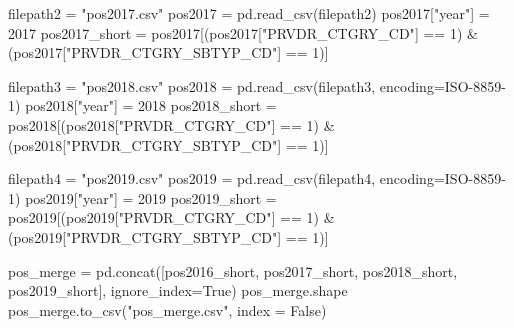 \documentclass[
  letterpaper,
  DIV=11,
  numbers=noendperiod]{scrartcl}
\newenvironment{Shaded}{\begin{snugshade}}{\end{snugshade}}
\newcommand{\DecValTok}[1]{\textcolor[rgb]{0.68,0.00,0.00}{#1}}
\newcommand{\NormalTok}[1]{\textcolor[rgb]{0.00,0.23,0.31}{#1}}
\newcommand{\OperatorTok}[1]{\textcolor[rgb]{0.37,0.37,0.37}{#1}}
\newcommand{\StringTok}[1]{\textcolor[rgb]{0.13,0.47,0.30}{#1}}
\newcommand{\VariableTok}[1]{\textcolor[rgb]{0.07,0.07,0.07}{#1}}
\begin{document}
\begin{Shaded}
\begin{Highlighting}[]
\NormalTok{filepath2 }\OperatorTok{=} \StringTok{"pos2017.csv"}
\NormalTok{pos2017 }\OperatorTok{=}\NormalTok{ pd.read\_csv(filepath2)}
\NormalTok{pos2017[}\StringTok{"year"}\NormalTok{] }\OperatorTok{=} \DecValTok{2017}
\NormalTok{pos2017\_short }\OperatorTok{=}\NormalTok{ pos2017[(pos2017[}\StringTok{"PRVDR\_CTGRY\_CD"}\NormalTok{] }\OperatorTok{==} \DecValTok{1}\NormalTok{) }\OperatorTok{\&}\NormalTok{ (pos2017[}\StringTok{"PRVDR\_CTGRY\_SBTYP\_CD"}\NormalTok{] }\OperatorTok{==} \DecValTok{1}\NormalTok{)]}


\NormalTok{filepath3 }\OperatorTok{=} \StringTok{"pos2018.csv"}
\NormalTok{pos2018 }\OperatorTok{=}\NormalTok{ pd.read\_csv(filepath3, encoding}\OperatorTok{=}\StringTok{\textquotesingle{}ISO{-}8859{-}1\textquotesingle{}}\NormalTok{)}
\NormalTok{pos2018[}\StringTok{"year"}\NormalTok{] }\OperatorTok{=} \DecValTok{2018}
\NormalTok{pos2018\_short }\OperatorTok{=}\NormalTok{ pos2018[(pos2018[}\StringTok{"PRVDR\_CTGRY\_CD"}\NormalTok{] }\OperatorTok{==} \DecValTok{1}\NormalTok{) }\OperatorTok{\&}\NormalTok{ (pos2018[}\StringTok{"PRVDR\_CTGRY\_SBTYP\_CD"}\NormalTok{] }\OperatorTok{==} \DecValTok{1}\NormalTok{)]}

\NormalTok{filepath4 }\OperatorTok{=} \StringTok{"pos2019.csv"}
\NormalTok{pos2019 }\OperatorTok{=}\NormalTok{ pd.read\_csv(filepath4, encoding}\OperatorTok{=}\StringTok{\textquotesingle{}ISO{-}8859{-}1\textquotesingle{}}\NormalTok{)}
\NormalTok{pos2019[}\StringTok{"year"}\NormalTok{] }\OperatorTok{=} \DecValTok{2019}
\NormalTok{pos2019\_short }\OperatorTok{=}\NormalTok{ pos2019[(pos2019[}\StringTok{"PRVDR\_CTGRY\_CD"}\NormalTok{] }\OperatorTok{==} \DecValTok{1}\NormalTok{) }\OperatorTok{\&}\NormalTok{ (pos2019[}\StringTok{"PRVDR\_CTGRY\_SBTYP\_CD"}\NormalTok{] }\OperatorTok{==} \DecValTok{1}\NormalTok{)]}
\end{Highlighting}
\end{Shaded}

\begin{Shaded}
\begin{Highlighting}[]
\NormalTok{pos\_merge }\OperatorTok{=}\NormalTok{ pd.concat([pos2016\_short, pos2017\_short, pos2018\_short, pos2019\_short], ignore\_index}\OperatorTok{=}\VariableTok{True}\NormalTok{)}
\NormalTok{pos\_merge.shape}
\NormalTok{pos\_merge.to\_csv(}\StringTok{"pos\_merge.csv"}\NormalTok{, index }\OperatorTok{=} \VariableTok{False}\NormalTok{)}
\end{Highlighting}
\end{Shaded}
\end{document}
